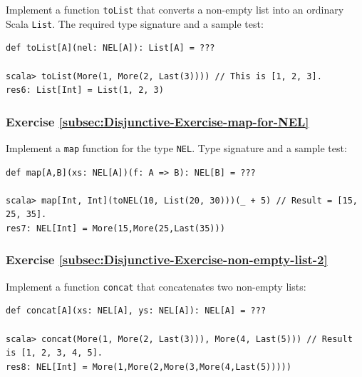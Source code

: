 Implement a function \lstinline!toList! that converts a non-empty
list into an ordinary Scala \lstinline!List!. The required type signature
and a sample test:
\begin{lstlisting}
def toList[A](nel: NEL[A]): List[A] = ???

scala> toList(More(1, More(2, Last(3)))) // This is [1, 2, 3].
res6: List[Int] = List(1, 2, 3)
\end{lstlisting}

\subsubsection{Exercise \label{subsec:Disjunctive-Exercise-map-for-NEL}\ref{subsec:Disjunctive-Exercise-map-for-NEL}}

Implement a \lstinline!map! function for the type \lstinline!NEL!.
Type signature and a sample test:
\begin{lstlisting}
def map[A,B](xs: NEL[A])(f: A => B): NEL[B] = ???

scala> map[Int, Int](toNEL(10, List(20, 30)))(_ + 5) // Result = [15, 25, 35].
res7: NEL[Int] = More(15,More(25,Last(35)))
\end{lstlisting}


\subsubsection{Exercise \label{subsec:Disjunctive-Exercise-non-empty-list-2}\ref{subsec:Disjunctive-Exercise-non-empty-list-2}}

Implement a function \lstinline!concat! that concatenates two non-empty
lists:
\begin{lstlisting}
def concat[A](xs: NEL[A], ys: NEL[A]): NEL[A] = ???

scala> concat(More(1, More(2, Last(3))), More(4, Last(5))) // Result is [1, 2, 3, 4, 5].
res8: NEL[Int] = More(1,More(2,More(3,More(4,Last(5)))))
\end{lstlisting}


